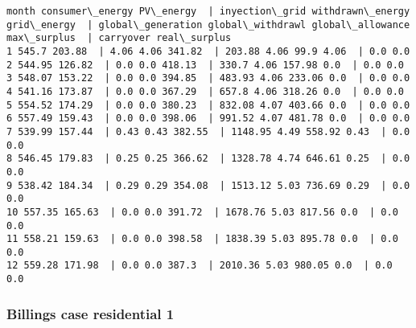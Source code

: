 \documentclass[11pt]{article}
\begin{document}
    \begin{Verbatim}[commandchars=\\\{\}]
month consumer\_energy PV\_energy  | inyection\_grid withdrawn\_energy grid\_energy  | global\_generation global\_withdrawl global\_allowance max\_surplus  | carryover real\_surplus
1 545.7 203.88  | 4.06 4.06 341.82  | 203.88 4.06 99.9 4.06  | 0.0 0.0
2 544.95 126.82  | 0.0 0.0 418.13  | 330.7 4.06 157.98 0.0  | 0.0 0.0
3 548.07 153.22  | 0.0 0.0 394.85  | 483.93 4.06 233.06 0.0  | 0.0 0.0
4 541.16 173.87  | 0.0 0.0 367.29  | 657.8 4.06 318.26 0.0  | 0.0 0.0
5 554.52 174.29  | 0.0 0.0 380.23  | 832.08 4.07 403.66 0.0  | 0.0 0.0
6 557.49 159.43  | 0.0 0.0 398.06  | 991.52 4.07 481.78 0.0  | 0.0 0.0
7 539.99 157.44  | 0.43 0.43 382.55  | 1148.95 4.49 558.92 0.43  | 0.0 0.0
8 546.45 179.83  | 0.25 0.25 366.62  | 1328.78 4.74 646.61 0.25  | 0.0 0.0
9 538.42 184.34  | 0.29 0.29 354.08  | 1513.12 5.03 736.69 0.29  | 0.0 0.0
10 557.35 165.63  | 0.0 0.0 391.72  | 1678.76 5.03 817.56 0.0  | 0.0 0.0
11 558.21 159.63  | 0.0 0.0 398.58  | 1838.39 5.03 895.78 0.0  | 0.0 0.0
12 559.28 171.98  | 0.0 0.0 387.3  | 2010.36 5.03 980.05 0.0  | 0.0 0.0

    \end{Verbatim}

    \hypertarget{billings-case-residential-1}{%
\subsubsection{Billings case residential
1}\label{billings-case-residential-1}}
\end{document}
